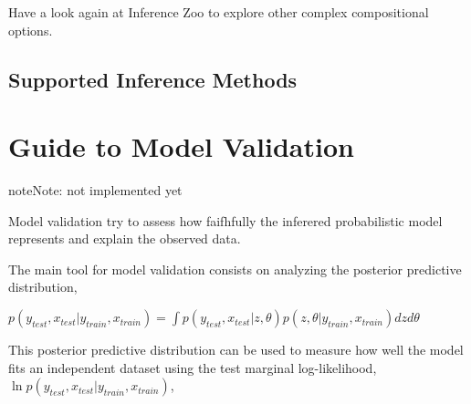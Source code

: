 \documentclass[letterpaper,10pt,english]{sphinxmanual}
\begin{document}
\begin{sphinxVerbatim}[commandchars=\\\{\}]
   \PYG{p}{[}\PYG{p}{]}  

  \PYG{p}{[}\PYG{p}{]}   

   
  
\end{sphinxVerbatim}

Have a look again at Inference Zoo to explore other complex
compositional options.


\section{Supported Inference Methods}
\label{\detokenize{notes/guideinference:supported-inference-methods}}

\chapter{Guide to Model Validation}
\label{\detokenize{notes/guidevalidation::doc}}\label{\detokenize{notes/guidevalidation:guide-to-model-validation}}
\begin{sphinxadmonition}{note}{Note:}
not implemented yet
\end{sphinxadmonition}

Model validation try to assess how faifhfully the inferered
probabilistic model represents and explain the observed data.

The main tool for model validation consists on analyzing the posterior
predictive distribution,

\(p(y_{test}, x_{test}|y_{train}, x_{train}) = \int p(y_{test}, x_{test}|z,\theta)p(z,\theta|y_{train}, x_{train}) dzd\theta\)

This posterior predictive distribution can be used to measure how well
the model fits an independent dataset using the test marginal
log-likelihood, \(\ln p(y_{test}, x_{test}|y_{train}, x_{train})\),

\begin{sphinxVerbatim}[commandchars=\\\{\}]
     \PYG{p}{[}\PYG{p}{]}
\end{sphinxVerbatim}
\end{document}
